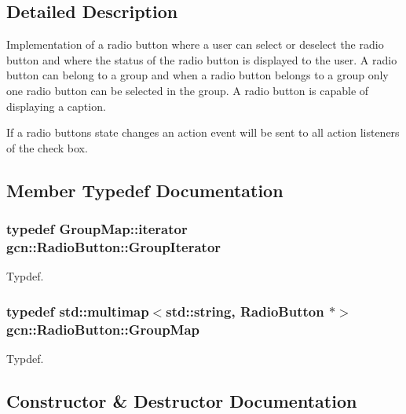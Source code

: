 \subsection{Detailed Description}
Implementation of a radio button where a user can select or deselect the radio button and where the status of the radio button is displayed to the user. A radio button can belong to a group and when a radio button belongs to a group only one radio button can be selected in the group. A radio button is capable of displaying a caption.

If a radio button\textquotesingle{}s state changes an action event will be sent to all action listeners of the check box. 

\subsection{Member Typedef Documentation}
\subsubsection[{\texorpdfstring{Group\+Iterator}{GroupIterator}}]{\setlength{\rightskip}{0pt plus 5cm}typedef Group\+Map\+::iterator {\bf gcn\+::\+Radio\+Button\+::\+Group\+Iterator}\hspace{0.3cm}{\ttfamily [protected]}}\hypertarget{classgcn_1_1RadioButton_ad3dcf28d1a77244db15cee3b6b04bed1}{}\label{classgcn_1_1RadioButton_ad3dcf28d1a77244db15cee3b6b04bed1}
Typdef. 
\subsubsection[{\texorpdfstring{Group\+Map}{GroupMap}}]{\setlength{\rightskip}{0pt plus 5cm}typedef std\+::multimap$<$std\+::string, {\bf Radio\+Button} $\ast$$>$ {\bf gcn\+::\+Radio\+Button\+::\+Group\+Map}\hspace{0.3cm}{\ttfamily [protected]}}\hypertarget{classgcn_1_1RadioButton_ae1ca6884bf6ce4bea9ba768366aed302}{}\label{classgcn_1_1RadioButton_ae1ca6884bf6ce4bea9ba768366aed302}
Typdef. 

\subsection{Constructor \& Destructor Documentation}
